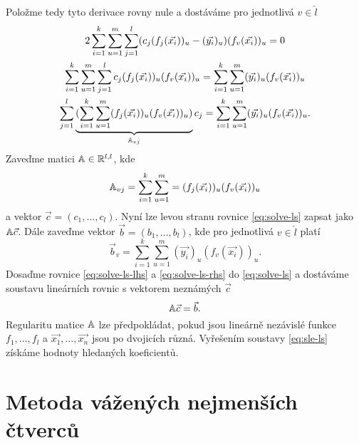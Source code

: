 Položme tedy tyto derivace rovny nule a dostáváme pro jednotlivá $v \in \hat l$
\begin{multline}
\label{eq:solve-ls}
  2\sum_{i=1}^k\sum_{u=1}^m\sum_{j=1}^l (c_j(f_j(\vec{x_i}))_u - (\vec{y_i})_u)(f_v(\vec{x_i}))_u = 0\\
  \sum_{i=1}^k\sum_{u=1}^m\sum_{j=1}^l c_j(f_j(\vec{x_i}))_u (f_v(\vec{x_i}))_u = \sum_{i=1}^k\sum_{u=1}^m(\vec{y_i})_u(f_v(\vec{x_i}))_u\\
  \sum_{j=1}^l\underbrace{(\sum_{i=1}^k\sum_{u=1}^m(f_j(\vec{x_i}))_u (f_v(\vec{x_i}))_u)}_{\mathbb{A}_{vj}}c_j = \sum_{i=1}^k\sum_{u=1}^m(\vec{y_i})_u(f_v(\vec{x_i}))_u.\\
\end{multline}
Zaveďme matici $\mathbb{A} \in \mathbb{R}^{l,l}$, kde 
\begin{equation}
\label{eq:solve-ls-lhs}
  \mathbb{A}_{vj} = \sum_{i=1}^k\sum_{u=1}^m = (f_j(\vec{x_i}))_u(f_v(\vec{x_i}))_u
\end{equation}
a vektor $\vec{c} = (c_1,\ldots,c_l)$. Nyní lze levou stranu rovnice \ref{eq:solve-ls} zapsat jako $\mathbb{A}\vec{c}$. Dále zaveďme vektor $\vec{b} = (b_1,\ldots,b_l)$, kde pro jednotlivá $v \in \hat l$ platí
\begin{equation}
\label{eq:solve-ls-rhs}
  \vec{b}_v = \sum_{i=1}^k\sum_{u=1}^m (\vec{y_i})_u (f_v(\vec{x_i}))_u.
\end{equation}
Dosaďme rovnice \ref{eq:solve-ls-lhs} a \ref{eq:solve-ls-rhs} do \ref{eq:solve-ls} a dostáváme soustavu lineárních rovnic s vektorem neznámých $\vec{c}$
\begin{equation}
  \label{eq:sle-ls}
  \mathbb{A}\vec{c} = \vec{b}.
\end{equation}
Regularitu matice $\mathbb{A}$ lze předpokládat, pokud jsou lineárně nezávislé funkce $f_1, \ldots, f_l$ a $\vec{x_1}, \ldots, \vec{x_n}$ jsou po dvojicích různá. Vyřešením soustavy \ref{eq:sle-ls} získáme hodnoty hledaných koeficientů.

\section{Metoda vážených nejmenších čtverců}

